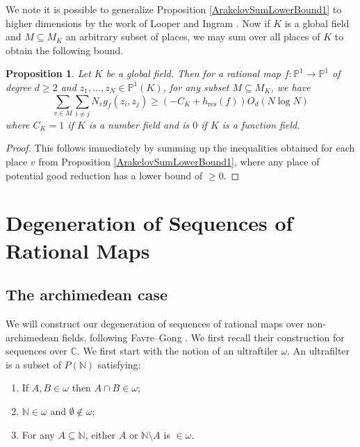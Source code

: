 \documentclass[10pt]{amsart}
\newcommand{\bb}{\mathbb}
\newcommand{\res}{\operatorname{res}}
\numberwithin{theorem}{section}
\newtheorem{proposition}[theorem]{Proposition}
\numberwithin{example}{section}
\numberwithin{definition}{section}
\begin{document}
We note it is possible to generalize Proposition \ref{ArakelovSumLowerBound1} to higher dimensions by the work of Looper \cite{Loo24} and Ingram \cite{Ing22}. Now if $K$ is a global field and $M \subseteq M_K$ an arbitrary subset of places, we may sum over all places of $K$ to obtain the following bound. 


\begin{proposition} \label{ArakelovSumLowerBound2}
Let $K$ be a global field. Then for a rational map $f: \bb{P}^1 \to \bb{P}^1$ of degree $d \geq 2$ and $z_1,\ldots,z_N \in \bb{P}^1(K)$, for any subset $M \subseteq M_K$, we have 
$$\sum_{v \in M} \sum_{i \not = j} N_v g_f(z_i,z_j) \geq (-C_K + h_{\res}(f)) O_d(N \log N)$$
where $C_K = 1$ if $K$ is a number field and is $0$ if $K$ is a function field.
\end{proposition}

\begin{proof}
This follows immediately by summing up the inequalities obtained for each place $v$ from Proposition \ref{ArakelovSumLowerBound1}, where any place of potential good reduction has a lower bound of $\geq 0$.     
\end{proof}

\section{Degeneration of Sequences of Rational Maps}
\subsection{The archimedean case} \label{sec: Archimedean}
We will construct our degeneration of sequences of rational maps over non-archimedean fields, following Favre--Gong \cite{FG24}. We first recall their construction for sequences over $\bb{C}$. We first start with the notion of an ultraftiler $\omega$. An ultrafilter is a subset of $P(\bb{N})$ satisfying:

\begin{enumerate}
\item If $A,B \in \omega$ then $A \cap B \in \omega$;
\item $\bb{N} \in \omega$ and $\emptyset \not \in \omega$;
\item For any $A \subseteq \bb{N}$, either $A$ or $\bb{N} \setminus A$ is $\in \omega$.
\end{enumerate}
\end{document}
